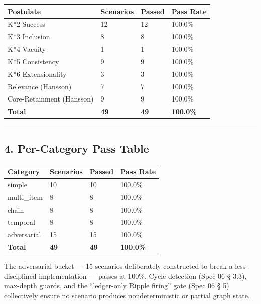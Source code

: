 \documentclass[
]{article}
\newcounter{none} %
\begin{document}
{\def\LTcaptype{none} %
\begin{longtable}[]{@{}llll@{}}
\toprule\noalign{}
Postulate & Scenarios & Passed & Pass Rate \\
\midrule\noalign{}
\endhead
\bottomrule\noalign{}
\endlastfoot
K*2 Success & 12 & 12 & 100.0\% \\
K*3 Inclusion & 8 & 8 & 100.0\% \\
K*4 Vacuity & 1 & 1 & 100.0\% \\
K*5 Consistency & 9 & 9 & 100.0\% \\
K*6 Extensionality & 3 & 3 & 100.0\% \\
Relevance (Hansson) & 7 & 7 & 100.0\% \\
Core-Retainment (Hansson) & 9 & 9 & 100.0\% \\
\textbf{Total} & \textbf{49} & \textbf{49} & \textbf{100.0\%} \\
\end{longtable}
}

\begin{center}\rule{0.5\linewidth}{0.5pt}\end{center}

\subsection{4. Per-Category Pass Table}\label{per-category-pass-table}

{\def\LTcaptype{none} %
\begin{longtable}[]{@{}llll@{}}
\toprule\noalign{}
Category & Scenarios & Passed & Pass Rate \\
\midrule\noalign{}
\endhead
\bottomrule\noalign{}
\endlastfoot
simple & 10 & 10 & 100.0\% \\
multi\_item & 8 & 8 & 100.0\% \\
chain & 8 & 8 & 100.0\% \\
temporal & 8 & 8 & 100.0\% \\
adversarial & 15 & 15 & 100.0\% \\
\textbf{Total} & \textbf{49} & \textbf{49} & \textbf{100.0\%} \\
\end{longtable}
}

The adversarial bucket --- 15 scenarios deliberately constructed to
break a less-disciplined implementation --- passes at 100\%. Cycle
detection (Spec 06 § 3.3), max-depth guards, and the ``ledger-only
Ripple firing'' gate (Spec 06 § 5) collectively ensure no scenario
produces nondeterministic or partial graph state.
\end{document}
